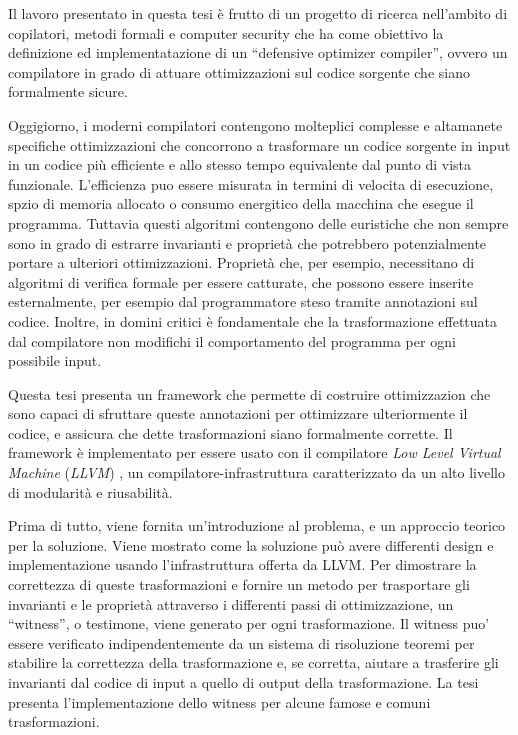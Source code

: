 
Il lavoro presentato in questa tesi è frutto di un progetto di ricerca nell'ambito di copilatori, metodi formali e computer security che ha come obiettivo la definizione ed implementatazione di un ``defensive optimizer compiler'', ovvero un compilatore in grado di attuare ottimizzazioni sul codice sorgente che siano formalmente sicure.

Oggigiorno, i moderni compilatori contengono molteplici complesse e altamanete specifiche ottimizzazioni che concorrono a trasformare un codice sorgente in input in un codice più efficiente e allo stesso tempo equivalente dal punto di vista funzionale. L'efficienza puo essere misurata in termini di velocita di esecuzione, spzio di memoria allocato o consumo energitico della macchina che esegue il programma. Tuttavia questi algoritmi contengono delle euristiche che non sempre sono in grado di estrarre invarianti e proprietà che potrebbero potenzialmente portare a ulteriori ottimizzazioni. Proprietà che, per esempio, necessitano di algoritmi di verifica formale per essere catturate, che possono essere inserite esternalmente, per esempio dal programmatore steso tramite annotazioni sul codice. Inoltre, in domini critici è fondamentale che la trasformazione effettuata dal compilatore non modifichi il comportamento del programma per ogni possibile input.

Questa tesi presenta un framework che permette di costruire ottimizzazion che sono capaci di sfruttare queste annotazioni per ottimizzare ulteriormente il codice, e assicura che dette trasformazioni siano formalmente corrette. Il framework è implementato per essere usato con il compilatore \emph{Low Level Virtual Machine} (\emph{LLVM}) \cite{lattner2002llvm}, un compilatore-infrastruttura caratterizzato da un alto livello di modularità e riusabilità.\

Prima di tutto, viene fornita un'introduzione al problema, e un approccio teorico per la soluzione. Viene mostrato come la soluzione può avere differenti design e implementazione usando l'infrastruttura offerta da LLVM. Per dimostrare la correttezza di queste trasformazioni e fornire un metodo per trasportare gli invarianti e le proprietà attraverso i differenti passi di ottimizzazione, un ``witness'', o testimone, viene generato per ogni trasformazione. Il witness puo' essere verificato indipendentemente da un sistema di risoluzione teoremi per stabilire la correttezza della trasformazione e, se corretta, aiutare a trasferire gli invarianti dal codice di input a quello di output della trasformazione. La tesi presenta l'implementazione dello witness per alcune famose e comuni trasformazioni.
